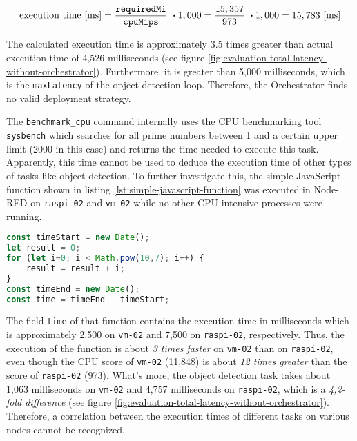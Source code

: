 \[\textrm{execution time [ms]} = \frac{\textrm{\texttt{requiredMi}}}{\textrm{\texttt{cpuMips}}}\ \boldsymbol{\cdot} 1,000 = \frac{15,357}{973}\ \boldsymbol{\cdot} 1,000 = 15,783 \textrm{ [ms]}\]

The calculated execution time is approximately 3.5 times greater than actual execution time of 4,526 milliseconds (see figure \ref{fig:evaluation-total-latency-without-orchestrator}).
Furthermore, it is greater than 5,000 milliseconds, which is the \texttt{maxLatency} of the opject detection loop. 
Therefore, the Orchestrator finds no valid deployment strategy.

The \texttt{benchmark\_cpu} command internally uses the CPU benchmarking tool \texttt{sysbench} which searches for all prime numbers between 1 and a certain upper limit (2000 in this case) and returns the time needed to execute this task.
Apparently, this time cannot be used to deduce the execution time of other types of tasks like object detection.
To further investigate this, the simple JavaScript function shown in listing \ref{lst:simple-javascript-function} was executed in Node-RED on \texttt{raspi-02} and \texttt{vm-02} while no other CPU intensive processes were running.

\begin{lstlisting}[language=JavaScript,numbers=none,caption={JavaScript function which executes simple mathematical tasks while measuring the total execution time},label=lst:simple-javascript-function]
const timeStart = new Date();
let result = 0;
for (let i=0; i < Math.pow(10,7); i++) {
    result = result + i;
}
const timeEnd = new Date();
const time = timeEnd - timeStart;
\end{lstlisting}

The field \texttt{time} of that function contains the execution time in milliseconds which is approximately 2,500 on \texttt{vm-02} and 7,500 on \texttt{raspi-02}, respectively. 
Thus, the execution of the function is about \textit{3 times faster} on \texttt{vm-02} than on \texttt{raspi-02}, even though the CPU score of \texttt{vm-02} (11,848) is about \textit{12 times greater} than the score of \texttt{raspi-02} (973).
What's more, the object detection task takes about 1,063 milliseconds on \texttt{vm-02} and 4,757 milliseconds on \texttt{raspi-02}, which is a \textit{4,2-fold difference} (see figure \ref{fig:evaluation-total-latency-without-orchestrator}).
Therefore, a correlation between the execution times of different tasks on various nodes cannot be recognized.


